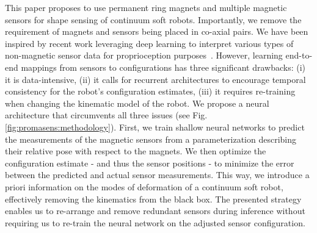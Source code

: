 This paper proposes to use permanent ring magnets and multiple magnetic sensors for shape sensing of continuum soft robots. Importantly, we remove the requirement of magnets and sensors being placed in co-axial pairs.
%
We have been inspired by recent work leveraging deep learning to interpret various types of non-magnetic sensor data for proprioception purposes~\cite{truby2020distributed, ding2021predictive, soter2018bodily, thuruthel2019soft}.
%
However, learning end-to-end mappings from sensors to configurations has three significant drawbacks: (i) it is data-intensive, (ii) it calls for recurrent architectures to encourage temporal consistency for the robot's configuration estimates, (iii) it requires re-training when changing the kinematic model of the robot. We propose a neural architecture that circumvents all three issues (see Fig. \ref{fig:promasens:methodology}).
First, we train shallow neural networks to predict the measurements of the magnetic sensors from a parameterization describing their relative pose with respect to the magnets. We then optimize the configuration estimate - and thus the sensor positions - to minimize the error between the predicted and actual sensor measurements. 
This way, we introduce a priori information on the modes of deformation of a continuum soft robot, effectively removing the kinematics from the black box. 
The presented strategy enables us to re-arrange and remove redundant sensors during inference without requiring us to re-train the neural network on the adjusted sensor configuration.


